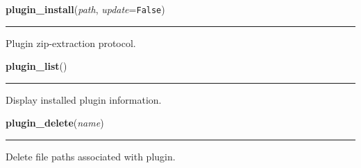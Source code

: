     \label{sakura:plugin_install}

    \vspace{0.5ex}

\hspace{.8\funcindent}\begin{boxedminipage}{\funcwidth}

    \raggedright \textbf{plugin\_install}(\textit{path}, \textit{update}={\tt False})

    \vspace{-1.5ex}

    \rule{\textwidth}{0.5\fboxrule}
\setlength{\parskip}{2ex}
    Plugin zip-extraction protocol.

\setlength{\parskip}{1ex}
    \end{boxedminipage}

    \label{sakura:plugin_list}

    \vspace{0.5ex}

\hspace{.8\funcindent}\begin{boxedminipage}{\funcwidth}

    \raggedright \textbf{plugin\_list}()

    \vspace{-1.5ex}

    \rule{\textwidth}{0.5\fboxrule}
\setlength{\parskip}{2ex}
    Display installed plugin information.

\setlength{\parskip}{1ex}
    \end{boxedminipage}

    \label{sakura:plugin_delete}

    \vspace{0.5ex}

\hspace{.8\funcindent}\begin{boxedminipage}{\funcwidth}

    \raggedright \textbf{plugin\_delete}(\textit{name})

    \vspace{-1.5ex}

    \rule{\textwidth}{0.5\fboxrule}
\setlength{\parskip}{2ex}
    Delete file paths associated with plugin.

\setlength{\parskip}{1ex}
    \end{boxedminipage}

